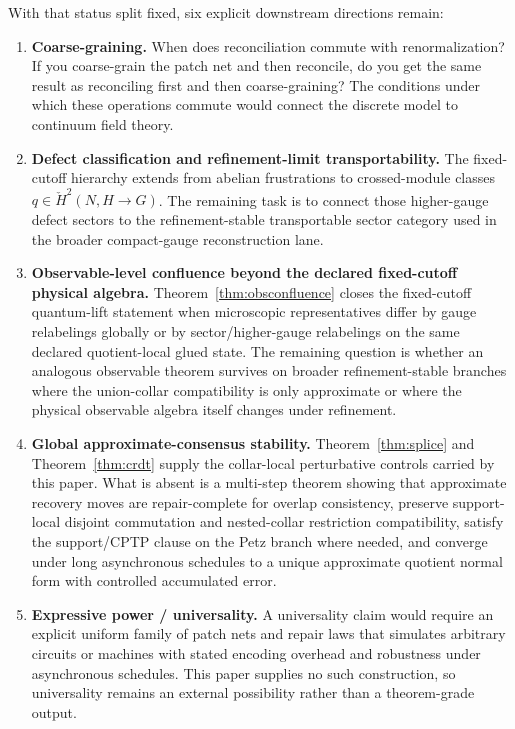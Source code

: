 \documentclass[11pt]{article}
\theoremstyle{remark}
\theoremstyle{plain}
\begin{document}
With that status split fixed, six explicit downstream directions remain:

\begin{enumerate}
\item \textbf{Coarse-graining.} When does reconciliation commute with renormalization? If you coarse-grain the patch net and then reconcile, do you get the same result as reconciling first and then coarse-graining? The conditions under which these operations commute would connect the discrete model to continuum field theory.

\item \textbf{Defect classification and refinement-limit transportability.} The fixed-cutoff hierarchy extends from abelian frustrations to crossed-module classes \(q\in \check H^2(N,H\to G)\). The remaining task is to connect those higher-gauge defect sectors to the refinement-stable transportable sector category used in the broader compact-gauge reconstruction lane.

\item \textbf{Observable-level confluence beyond the declared fixed-cutoff physical algebra.} Theorem~\ref{thm:obsconfluence} closes the fixed-cutoff quantum-lift statement when microscopic representatives differ by gauge relabelings globally or by sector/higher-gauge relabelings on the same declared quotient-local glued state. The remaining question is whether an analogous observable theorem survives on broader refinement-stable branches where the union-collar compatibility is only approximate or where the physical observable algebra itself changes under refinement.

\item \textbf{Global approximate-consensus stability.} Theorem~\ref{thm:splice} and Theorem~\ref{thm:crdt} supply the collar-local perturbative controls carried by this paper. What is absent is a multi-step theorem showing that approximate recovery moves are repair-complete for overlap consistency, preserve support-local disjoint commutation and nested-collar restriction compatibility, satisfy the support/CPTP clause on the Petz branch where needed, and converge under long asynchronous schedules to a unique approximate quotient normal form with controlled accumulated error.

\item \textbf{Expressive power / universality.} A universality claim would require an explicit uniform family of patch nets and repair laws that simulates arbitrary circuits or machines with stated encoding overhead and robustness under asynchronous schedules. This paper supplies no such construction, so universality remains an external possibility rather than a theorem-grade output.


\end{enumerate}
\end{document}
